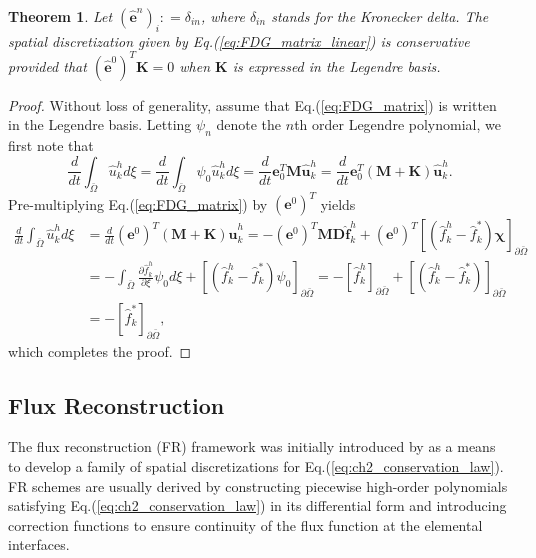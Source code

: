 \documentclass[preprint,12pt]{elsarticle}
\newtheorem{theorem}{Theorem}
\begin{document}
\begin{theorem}
    \label{theo:FDG_conservative}
    Let $(\hat{\mathbf{e}}^n)_i : = \delta_{in}$, where $\delta_{in}$ stands for the Kronecker delta. The spatial discretization given by Eq.(\ref{eq:FDG_matrix_linear}) is conservative provided that $(\hat{\mathbf{e}}^0)^T\mathbf{K} = 0$ when $\mathbf{K}$ is expressed in the Legendre basis.
\end{theorem}
\begin{proof}
    Without loss of generality, assume that Eq.(\ref{eq:FDG_matrix}) is written in the Legendre basis. Letting $\psi_n$ denote the $n$th order Legendre polynomial, we first note that
    \begin{equation}
    \frac{d}{dt} \int_{\bar{\Omega}} \hat{u}^h_k d \xi
    =
    \frac{d}{dt} \int_{\bar{\Omega}} \psi_{0} \hat{u}^h_k d \xi
    = \frac{d}{dt} \mathbf{e}_0^T \mathbf{M} \hat{\mathbf{u}}_k^h
    =\frac{d}{dt}\mathbf{e}_0^T(\mathbf{M} + \mathbf{K})\hat{\mathbf{u}}^h_k.
\end{equation}
Pre-multiplying Eq.(\ref{eq:FDG_matrix}) by $(\mathbf{e}^0)^T$ yields
\begin{align}
    \frac{d}{dt} \int_{\bar{\Omega}} \hat{u}^h_k d \xi
    &=
    \frac{d}{dt}(\mathbf{e}^0)^T(\mathbf{M} + \mathbf{K})\hat{\mathbf{u}}^h_k
    =
    -(\mathbf{e}^0)^T\mathbf{M}\mathbf{D} \hat{\mathbf{f}}_k^h
    + (\mathbf{e}^0)^T\left[(\hat{f}_k^h - \hat{f}_k^{*})\bm{\chi}\right]_{\partial \bar{\Omega}}
    \nonumber \\
    &=
    -\int_{\bar{\Omega}} \frac{\partial \hat{f}^h_k}{\partial \xi} \psi_0 d\xi
    + \left[(\hat{f}_k^h-\hat{f}^*_k)\psi_0\right]_{\partial\bar{\Omega}}
    =
    -\left[\hat{f}_k^h\right]_{\partial\bar{\Omega}}
    + \left[(\hat{f}_k^h-\hat{f}^*_k)\right]_{\partial\bar{\Omega}} \nonumber \\
    &= -\left[\hat{f}^*_k\right]_{\partial\bar{\Omega}},
\end{align}
which completes the proof.
\end{proof}

\subsection{Flux Reconstruction}
The flux reconstruction (FR) framework was initially introduced by \cite{huynh2007flux} as a means to develop a family of spatial discretizations for Eq.(\ref{eq:ch2_conservation_law}). FR schemes are usually derived by constructing piecewise high-order polynomials satisfying Eq.(\ref{eq:ch2_conservation_law}) in its differential form and introducing correction functions to ensure continuity of the flux function at the elemental interfaces.
\end{document}
